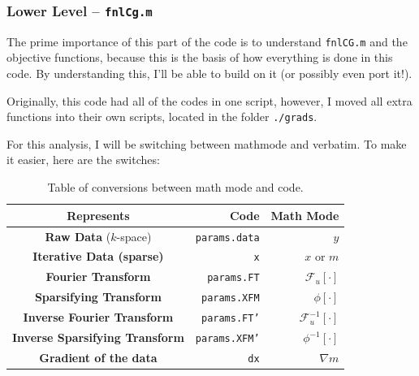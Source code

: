 \documentclass[11 pt]{article}
\begin{document}
    \subsubsection{Lower Level -- \texttt{fnlCg.m}}

      The prime importance of this part of the code is to understand \texttt{fnlCG.m} and the objective functions, because this is the basis of how everything is done in this code. By understanding this, I'll be able to build on it (or possibly even port it!).

      Originally, this code had all of the codes in one script, however, I moved all extra functions into their own scripts, located in the folder \texttt{./grads}.

      For this analysis, I will be switching between mathmode and verbatim. To make it easier, here are the switches:

      \begin{table}[h]
            \centering
            \begin{tabular}{| c || r | r | }
             \hline
             \textbf{Represents}                     & \textbf{Code}          & \textbf{Math Mode}          \\  \hline \hline
             \textbf{Raw Data} ($k$-space)           & \texttt{params.data}   & $y$                         \\  \hline
             \textbf{Iterative Data (sparse)}        & \texttt{x}             & $x$ or $m$                  \\  \hline
             \textbf{Fourier Transform}              & \texttt{params.FT}     & $\mathcal{F}_u[\cdot]$      \\  \hline
             \textbf{Sparsifying Transform}          & \texttt{params.XFM}    & $\phi[\cdot]$               \\  \hline
             \textbf{Inverse Fourier Transform}      & \texttt{params.FT'}    & $\mathcal{F}_u^{-1}[\cdot]$ \\  \hline
             \textbf{Inverse Sparsifying Transform}  & \texttt{params.XFM'}   & $\phi^{-1}[\cdot]$          \\  \hline
             \textbf{Gradient of the data}           & \texttt{dx}            & $\nabla m$          \\  \hline
            \end{tabular}
            \caption{Table of conversions between math mode and code.}
            \label{tab:conv}
            \end{table}
\end{document}
